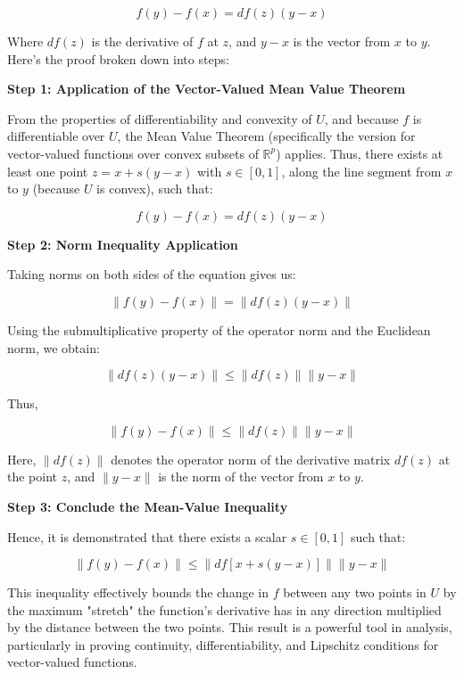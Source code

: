 \documentclass[8pt]{article}
\begin{document}
\[
f(y) - f(x) = df(z)(y - x)
\]

Where \( df(z) \) is the derivative of \( f \) at \( z \), and \( y - x \) is the vector from \( x \) to \( y \). Here's the proof broken down into steps:

\textbf{Step 1: Application of the Vector-Valued Mean Value Theorem}

From the properties of differentiability and convexity of \( U \), and because \( f \) is differentiable over \( U \), the Mean Value Theorem (specifically the version for vector-valued functions over convex subsets of \( \mathbb{R}^p \)) applies. Thus, there exists at least one point \( z = x + s(y - x) \) with \( s \in [0,1] \), along the line segment from \( x \) to \( y \) (because \( U \) is convex), such that:

\[
f(y) - f(x) = df(z)(y - x)
\]

\textbf{Step 2: Norm Inequality Application}

Taking norms on both sides of the equation gives us:

\[
\| f(y) - f(x) \| = \| df(z)(y - x) \|
\]

Using the submultiplicative property of the operator norm and the Euclidean norm, we obtain:

\[
\| df(z)(y - x) \| \leq \| df(z) \| \| y - x \|
\]

Thus,

\[
\| f(y) - f(x) \| \leq \| df(z) \| \| y - x \|
\]

Here, \( \| df(z) \| \) denotes the operator norm of the derivative matrix \( df(z) \) at the point \( z \), and \( \| y - x \| \) is the norm of the vector from \( x \) to \( y \).

\textbf{Step 3: Conclude the Mean-Value Inequality}

Hence, it is demonstrated that there exists a scalar \( s \in [0,1] \) such that:

\[
\| f(y) - f(x) \| \leq \| df[x + s(y - x)] \| \| y - x \|
\]

This inequality effectively bounds the change in \( f \) between any two points in \( U \) by the maximum "stretch" the function's derivative has in any direction multiplied by the distance between the two points. This result is a powerful tool in analysis, particularly in proving continuity, differentiability, and Lipschitz conditions for vector-valued functions.
\end{document}
